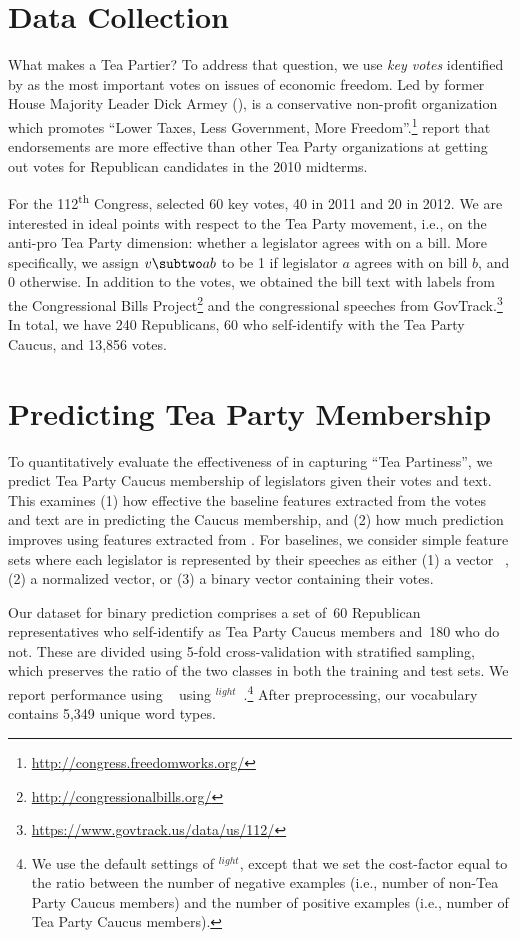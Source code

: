 
\section{Data Collection}
\label{sec:c6_data}


What makes a Tea Partier?  To address that question, we use
\textit{key votes} identified by \fw{} as the most important votes on
issues of economic freedom.  Led by former House Majority Leader Dick
Armey (), \fw{} is a conservative non-profit organization
which promotes ``Lower Taxes, Less Government, More
Freedom''.\footnote{\url{http://congress.freedomworks.org/}}
 report that \fw{} endorsements are
more effective than other Tea Party organizations at getting out votes
for Republican candidates in the 2010 midterms.

For the 112\textsuperscript{th} Congress, \fw{} selected 60 key votes,
40 in 2011 and 20 in 2012.  We are interested in ideal points with
respect to the Tea Party movement, i.e., on the anti-pro Tea Party
dimension: whether a legislator agrees with \fw{} on a bill. More
specifically, we assign $v \subtwo ab$ to be 1 if legislator $a$
agrees with \fw{} on bill $b$, and 0 otherwise. In addition to the votes, we obtained the bill text with labels from the Congressional Bills Project\footnote{\url{http://congressionalbills.org/}} and the congressional speeches from GovTrack.\footnote{\url{https://www.govtrack.us/data/us/112/}} In total, we have 240
Republicans, 60 who self-identify with the Tea Party Caucus, and
13,856 votes.


\section{Predicting Tea Party Membership}
\label{sec:c6_prediction}


To quantitatively evaluate the effectiveness of \name{} in
capturing ``Tea Partiness'', we predict Tea Party Caucus membership of
legislators given their votes and text. This examines (1) how effective the baseline
features extracted from the votes and text are in predicting the Caucus
membership, and (2) how much prediction improves using features extracted from \name{}.
For baselines, we consider simple feature sets where each legislator
is represented by their speeches as either (1) a \tfidf{}
vector ~\cite{salton-68}, (2) a normalized \tfidf{} vector, or (3) a binary vector
containing their votes.

Our dataset for binary prediction comprises a set of~60 Republican
representatives who self-identify as Tea Party Caucus members and~180
who do not.  These are divided using 5-fold cross-validation with stratified
sampling, which preserves the ratio of the two classes in both the training and
test sets.  We report performance using ~\cite{lusted-71} using
\svm{}$^{light}$~\cite{Joachims:CHAP99}.\footnote{We use the default settings of
  \svm{}$^{light}$, except that we set the cost-factor equal to the ratio
  between the number of negative examples (i.e., number of non-Tea Party Caucus
  members) and the number of positive examples (i.e., number of Tea Party Caucus
  members).}  After preprocessing, our vocabulary contains
5,349 unique word types.

